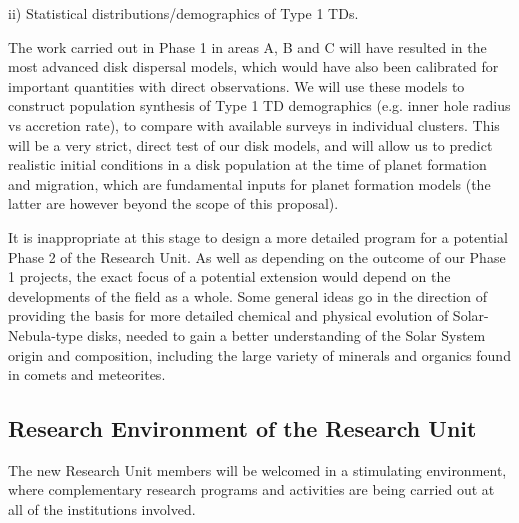 \documentclass[10pt,fleqn,twoside,a4paper]{article}
\begin{document}
\begin{Emphasize}
ii) Statistical distributions/demographics of Type 1 TDs. \\
\end{Emphasize}
The work carried out in Phase 1 in areas A, B and C will have resulted
in the most advanced disk dispersal models, which would have also been
calibrated for important quantities with direct observations. We will
use these models to construct population synthesis of Type 1
TD demographics (e.g. inner hole radius vs accretion
rate), to compare with available surveys in individual clusters.  
This will be a very strict, direct test of our disk models, and will
allow us to predict realistic initial conditions in a disk population at the
time of planet formation and migration, which are fundamental inputs
for planet formation models (the latter are however beyond the scope of this
proposal).  

It is inappropriate at this stage to design a more detailed program
for a potential Phase 2 of the Research Unit. As well as depending on
the outcome of our Phase 1 projects, the exact focus of a potential
extension would depend on the developments of the field as a
whole. Some general ideas go in the direction of providing the basis for more detailed chemical
and physical evolution of Solar-Nebula-type disks, needed to gain a
better understanding of the Solar System origin and composition,
including the large variety of minerals and organics found in comets
and meteorites. 
\vspace{0.8em}

\subsection{Research Environment of the Research Unit}

The new Research Unit members will be welcomed in a stimulating
environment, where complementary research programs and activities are
being carried out at all of the institutions involved. 
\vspace{1em}
\end{document}
